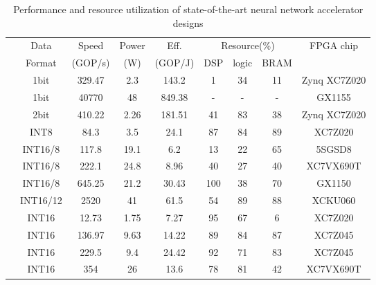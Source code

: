 \begin{table}[htbp]
    \centering
    \caption{Performance and resource utilization of state-of-the-art neural network accelerator designs}
    \begin{tabular}{|r|c|c|c|c|c|c|c|c|}
        \hline
        \multicolumn{1}{|c|}{} & Data  & Speed & Power & Eff. & \multicolumn{3}{c|}{Resource(\%)} & \multirow{2}[4]{*}{FPGA chip} \\
    \cline{6-8}    \multicolumn{1}{|c|}{} & Format & (GOP/s) & (W)   & (GOP/J) & DSP   & logic & BRAM  &  \\
        \hline
            \cite{nakahara2017fully}    & 1bit      & 329.47    & 2.3   & 143.2 & 1     & 34    & 11    & Zynq XC7Z020 \\ \hline
            \cite{moss2017high}         & 1bit      & 40770     & 48    & 849.38 &   -   &   -   &   -   & GX1155 \\ \hline
            \cite{jiao2017accelerating} & 2bit      & 410.22    & 2.26  & 181.51 & 41   & 83    & 38    & Zynq XC7Z020 \\ \hline
            \cite{guo2017angel}         & INT8      & 84.3      & 3.5   & 24.1  & 87    & 84    & 89    & XC7Z020 \\ \hline
            \cite{suda2016throughput}   & INT16/8   & 117.8     & 19.1  & 6.2   & 13    & 22    & 65    & 5SGSD8 \\ \hline
            \cite{liu2016automatic}     & INT16/8   & 222.1     & 24.8  & 8.96  & 40    & 27    & 40    & XC7VX690T \\ \hline
            \cite{ma2017optimizing}     & INT16/8   & 645.25    & 21.2  & 30.43 & 100   & 38    & 70    & GX1150 \\ \hline            
            \cite{han2017ese}           & INT16/12  & 2520      & 41    & 61.5  & 54    & 89    & 88    & XCKU060 \\ \hline
            \cite{venieris2017fpgaconvnet} & INT16  & 12.73     & 1.75  & 7.27  & 95    & 67    & 6     & XC7Z020 \\ \hline
            \cite{qiu2016going}         & INT16     & 136.97    & 9.63  & 14.22 & 89    & 84    & 87    & XC7Z045 \\ \hline
            \cite{xiao2017exploring}    & INT16     & 229.5     & 9.4   & 24.42 & 92    & 71    & 83    & XC7Z045 \\ \hline
            \cite{zhang2016caffeine}    & INT16     & 354       & 26    & 13.6  & 78    & 81    & 42    & XC7VX690T \\ \hline

\end{tabular}
\end{table}
